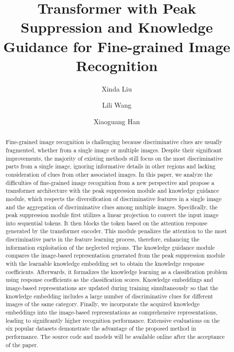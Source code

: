 \documentclass[5p,twocolumn]{elsarticle}
\begin{document}
\begin{frontmatter}

\title{Transformer with Peak Suppression and Knowledge Guidance for Fine-grained Image Recognition}





\author[mymainaddress]{Xinda Liu}
\author[mymainaddress]{Lili Wang}
\author[mysecondaryaddress]{Xiaoguang Han}

\address[mymainaddress]{State Key Laboratory of Virtual Reality Technology and Systems, Beihang University, Beijing, China}
\address[mysecondaryaddress]{Shenzhen Research Institute of Big Data, Shenzhen, China}

\begin{abstract}
Fine-grained image recognition is challenging because discriminative clues are usually fragmented, whether from a single image or multiple images. Despite their significant improvements, the majority of existing methods still focus on the most discriminative parts from a single image, ignoring informative details in other regions and lacking consideration of clues from other associated images. In this paper, we analyze the difficulties of fine-grained image recognition from a new perspective and propose a transformer architecture with the peak suppression module and knowledge guidance module, which respects the diversification of discriminative features in a single image and the aggregation of discriminative clues among multiple images. Specifically, the peak suppression module first utilizes a linear projection to convert the input image into sequential tokens. It then blocks the token based on the attention response generated by the transformer encoder. This module penalizes the attention to the most discriminative parts in the feature learning process, therefore, enhancing the information exploitation of the neglected regions. The knowledge guidance module compares the image-based representation generated from the peak suppression module with the learnable knowledge embedding set to obtain the knowledge response coefficients. Afterwards, it formalizes the knowledge learning as a classification problem using response coefficients as the classification scores. Knowledge embeddings and image-based representations are updated during training simultaneously so that the knowledge embedding includes a large number of discriminative clues for different images of the same category.  Finally, we incorporate the acquired knowledge embeddings into the image-based representations as comprehensive representations, leading to significantly higher recognition performance. Extensive evaluations on the six popular datasets demonstrate the advantage of the proposed method in performance. The source code and models will be available online after the acceptance of the paper.
\end{abstract}


\end{frontmatter}
\end{document}
